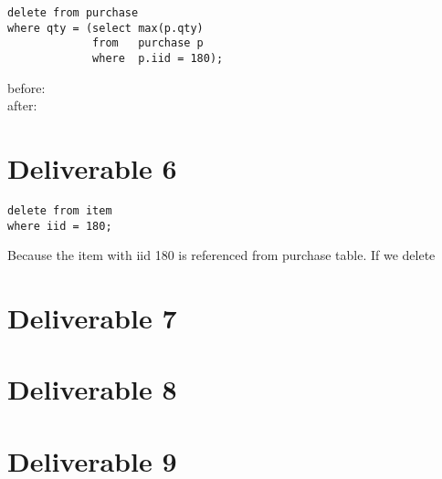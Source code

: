 \documentclass{article}
\begin{document}
\begin{verbatim}
delete from purchase
where qty = (select max(p.qty)
             from   purchase p
             where  p.iid = 180);
\end{verbatim}

\noindent before: \\


\noindent after:


\section{Deliverable 6}
\begin{verbatim}
delete from item
where iid = 180;
\end{verbatim}

Because the item with iid 180 is referenced from purchase table. If we delete 

\section{Deliverable 7}


\section{Deliverable 8}


\section{Deliverable 9}
\end{document}
